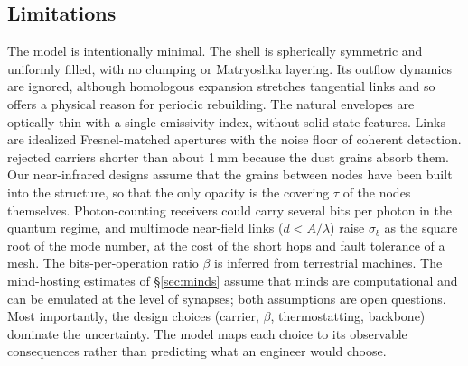 \documentclass[final,5p]{elsarticle}
\begin{document}
\subsection{Limitations}
The model is intentionally minimal. The shell is spherically symmetric and uniformly filled, with no clumping or Matryoshka layering. Its outflow dynamics are ignored, although homologous expansion stretches tangential links and so offers a physical reason for periodic rebuilding. The natural envelopes are optically thin with a single emissivity index, without solid-state features. Links are idealized Fresnel-matched apertures with the noise floor of coherent detection. \citet{LaughlinAdams2021} rejected carriers shorter than about 1\,mm because the dust grains absorb them. Our near-infrared designs assume that the grains between nodes have been built into the structure, so that the only opacity is the covering $\tau$ of the nodes themselves. Photon-counting receivers could carry several bits per photon in the quantum regime, and multimode near-field links ($d<A/\lambda$) raise $\sigma_b$ as the square root of the mode number, at the cost of the short hops and fault tolerance of a mesh. The bits-per-operation ratio $\beta$ is inferred from terrestrial machines. The mind-hosting estimates of \S\ref{sec:minds} assume that minds are computational and can be emulated at the level of synapses; both assumptions are open questions. Most importantly, the design choices (carrier, $\beta$, thermostatting, backbone) dominate the uncertainty. The model maps each choice to its observable consequences rather than predicting what an engineer would choose.

\end{document}
